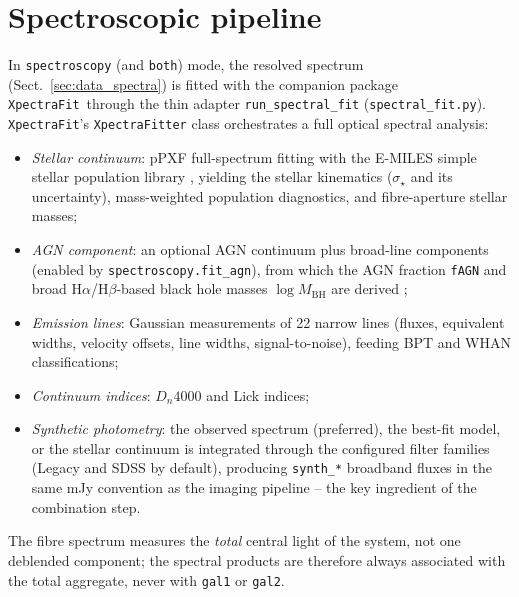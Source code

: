 \documentclass{aa}
\newcommand{\xpectrafit}{\texttt{XpectraFit}}
\begin{document}
\section{Spectroscopic pipeline}
\label{sec:spectroscopy}

In \texttt{spectroscopy} (and \texttt{both}) mode, the resolved spectrum
(Sect.~\ref{sec:data_spectra}) is fitted with the companion package
\xpectrafit\ through the thin adapter \texttt{run\_spectral\_fit}
(\texttt{spectral\_fit.py}). \xpectrafit's \texttt{XpectraFitter} class
orchestrates a full optical spectral analysis:

\begin{itemize}
\item \emph{Stellar continuum}: pPXF full-spectrum fitting
  \citep{cappellari2017} with the E-MILES simple stellar population
  library \citep{vazdekis2016}, yielding the stellar kinematics
  ($\sigma_\star$ and its uncertainty), mass-weighted population
  diagnostics, and fibre-aperture stellar masses;
\item \emph{AGN component}: an optional AGN continuum plus broad-line
  components (enabled by \texttt{spectroscopy.fit\_agn}), from which the
  AGN fraction \texttt{fAGN} and broad H$\alpha$/H$\beta$-based black
  hole masses $\log M_\mathrm{BH}$ are derived
  \citep[e.g.][]{greene2005};
\item \emph{Emission lines}: Gaussian measurements of 22 narrow lines
  (fluxes, equivalent widths, velocity offsets, line widths,
  signal-to-noise), feeding BPT \citep{baldwin1981,kewley2001,
  kauffmann2003} and WHAN \citep{cidfernandes2011} classifications;
\item \emph{Continuum indices}: $D_n4000$ \citep{balogh1999} and Lick
  indices;
\item \emph{Synthetic photometry}: the observed spectrum (preferred), the
  best-fit model, or the stellar continuum is integrated through the
  configured filter families (Legacy and SDSS by default), producing
  \texttt{synth\_*} broadband fluxes in the same mJy convention as the
  imaging pipeline -- the key ingredient of the combination step.
\end{itemize}

The fibre spectrum measures the \emph{total} central light of the system,
not one deblended component; the spectral products are therefore always
associated with the total aggregate, never with \texttt{gal1} or
\texttt{gal2}.
\end{document}
